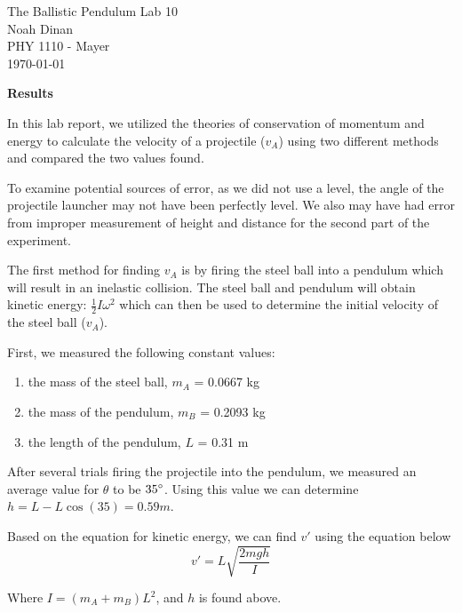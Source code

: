 \documentclass[12pt]{article}
\begin{document}
\begin{center}
\vspace*{\fill}
The Ballistic Pendulum Lab 10 \\ Noah Dinan \\ PHY 1110 - Mayer \\ \today \\
\vspace*{\fill}
\end{center}

\newpage
{} %
\setlength{\parindent}{0in}

\textbf{Results}

In this lab report, we utilized the theories of conservation of momentum and energy to calculate the velocity
of a projectile ($v_A$) using two different methods and compared the two values found.

To examine potential sources of error, as we did not use a level, the angle of the projectile launcher
may not have been perfectly level. We also may have had error from
improper measurement of height and distance for the second part of the experiment.

\vspace{0.5cm}

The first method for finding $v_A$ is by firing the steel ball into a pendulum which will result in an inelastic
collision. The steel ball and pendulum will obtain kinetic energy: $\frac{1}{2}I\omega^2$ which can then be used to
determine the initial velocity of the steel ball ($v_A$).

First, we measured the following constant values:
\begin{enumerate}
    \item the mass of the steel ball, $m_A$ = 0.0667 kg
    \item the mass of the pendulum, $m_B$ = 0.2093 kg
    \item the length of the pendulum, $L$ = 0.31 m
\end{enumerate}

After several trials firing the projectile into the pendulum, we measured an average value for $\theta$
to be $\text{35}\degree$. Using this value we can determine $h = L - L\cos(35) = 0.59 m$.

Based on the equation for kinetic energy, we can find $v\prime$ using the equation below
\[ v\prime = L\sqrt{\frac{2mgh}{I}} \]

Where $I = (m_A + m_B)L^2$, and $h$ is found above.
\end{document}
